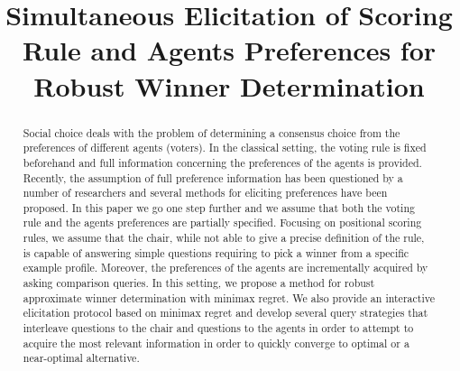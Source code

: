 \newrelation{\prefinc}{\!\parallel\!}%

\newcommand{\profile}{\bm{v}}%
\newcommand{\pprofile}{{\bm{p}}}%
\newcommand{\w}{\bm{w}}
\newcommand{\W}{\mathcal{W}}
\newcommand{\Co}{\mathcal{C}}
\newcommand{\pw}{W}%
\newcommand{\powersetz}[1]{\mathscr{P}^*(#1)}
\newcommand{\strat}[1]{\emph{#1}}

\DeclareMathOperator{\Regret}{Regret}
\DeclareMathOperator{\SCORE}{Score}
\DeclareMathOperator{\PMR}{PMR}
\DeclareMathOperator{\MR}{MR}
\DeclareMathOperator{\MMR}{MMR}
\DeclareMathOperator{\leximax}{leximax}
\DeclareMathOperator*{\argmax}{argmax}
\DeclareMathOperator*{\argmin}{argmin}

\newtheorem{claim}{Claim}
\newtheorem{prop}{Proposition}
\newtheorem{corollary}{Corollary}
\newtheorem{definition}{Definition}
\newtheorem{example}{Example}

\DeclarePairedDelimiter\set{\{}{\}}
\DeclarePairedDelimiter\card{\lvert}{\rvert}
\DeclarePairedDelimiter\abs{\lvert}{\rvert}

\hfuzz=1cm

\title{Simultaneous Elicitation of Scoring Rule and Agents Preferences for Robust Winner Determination}


\maketitle
\begin{abstract}
Social choice deals with the problem of determining a consensus choice from the preferences of different agents (voters).
In the classical setting, the voting rule is fixed beforehand and full information concerning the preferences of the agents is provided.
Recently, the assumption of full preference information has been questioned by a number of researchers and several methods for eliciting preferences have been proposed.
In this paper we go one step further and we assume that both the voting rule and the agents preferences are partially specified. Focusing on positional scoring rules, we assume that the chair, while  not able to give a precise definition of the rule, is capable of answering simple questions  requiring to pick a winner from a specific  example profile.
Moreover, the preferences of the agents are incrementally acquired by asking comparison queries. In this setting, we propose a method  for robust approximate winner determination with minimax regret. We also provide an interactive elicitation protocol based on minimax regret and develop several query strategies that interleave questions to the chair and questions to the agents in order to attempt to acquire the most relevant information in order to quickly converge to optimal or a near-optimal alternative.
\end{abstract}

